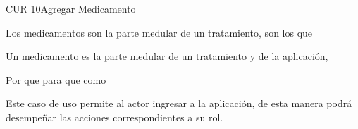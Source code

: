 \begin{UseCase}{CUR 10}{Agregar Medicamento}
	{
		Los medicamentos son la parte medular de un tratamiento, son los que 
		
		
		Un medicamento es la parte medular de un tratamiento y de la aplicación, 
		
		
		Por que
		para que
		como
		
		
		Este caso de uso permite al actor ingresar a la aplicación, de esta manera podrá desempeñar las acciones correspondientes a su rol.
		
	}
	

\end{UseCase}
